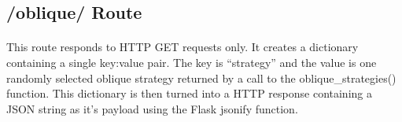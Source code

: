 \subsection{/oblique/ Route}
\paragraph{} This route responds to HTTP GET requests only. It creates a dictionary containing a single key:value pair. The key is ``strategy'' and the value is one randomly selected oblique strategy returned by a call to the oblique\_strategies() function. This dictionary is then turned into a HTTP response containing a JSON string as it's payload using the Flask jsonify function.







